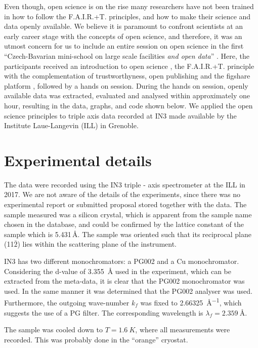 \documentclass[aps,pra,reprint,amsmath,amssymb,superscriptaddress,showkeys]{revtex4-1}
\begin{document}
Even though, open science is on the rise many researchers have not been trained in how to follow the F.A.I.R.+T. principles, and how to make their science and data openly available.
We believe it is paramount to confront scientists at an early career stage with the concepts of open science, and therefore, it was an utmost concern for us to include an entire session on open science in the first ``Czech-Bavarian mini-school on large scale facilities \emph{and open data}'' \cite{mini-school}.
Here, the participants received an introduction to open science \cite{foster}, the F.A.I.R.+T. principle \cite{FAIR} with the complementation of trustworthyness, open publishing \cite{arXiv} and the figshare platform \cite{figshare}, followed by a hands on session.
During the hands on session, openly available data was extracted, evaluated and analysed within approximately one hour, resulting in the data, graphs, and code \cite{data-evaluation} shown below.
We applied the open science principles to triple axis data recorded at IN3 \cite{data} made available by the Institute Laue-Langevin (ILL) in Grenoble.

\section{Experimental details}

The data were recorded using the IN3 triple - axis spectrometer \cite{IN3} at the ILL in 2017.
We are not aware of the details of the experiments, since there was no experimental report or submitted proposal stored together with the data.
The sample measured was a silicon crystal, which is apparent from the sample name chosen in the database, and could be confirmed by the lattice constant of the sample which is 5.431\,\AA \cite{Hom1975}. The sample was oriented such that its reciprocal plane (11$\bar{2}$) lies within the scattering plane of the instrument.

IN3 has two different monochromators: a PG002 and a Cu monochromator.
Considering the d-value of \SI{3.355}{\mbox{\AA}} used in the experiment, which can be extracted from the meta-data, it is clear that the PG002 monochromator was used.
In the same manner it was determined that the PG002 analyser was used. 
Furthermore, the outgoing wave-number $k_f$ was fixed to \SI{2.66325}{\mbox{\AA}^{-1}}, which suggests the use of a PG filter. 
The corresponding wavelength is $\lambda_f=\SI{2.359}{\mbox{\AA}}$.

The sample was cooled down to $T = \SI{1.6}{K}$, where all measurements were recorded. 
This was probably done in the ``orange'' cryostat.
\end{document}
